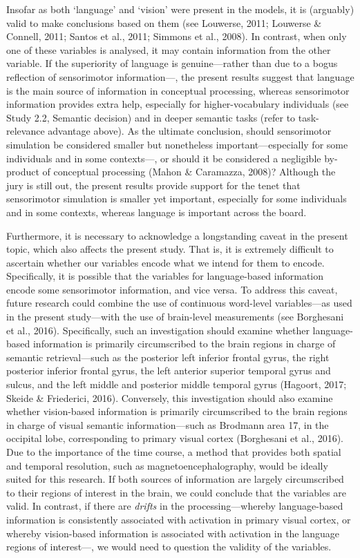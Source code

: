 \documentclass[
  12pt,
  man,floatsintext]{apa7}
\begin{document}
Insofar as both `language' and `vision' were present in the models, it is (arguably) valid to make conclusions based on them (see Louwerse, 2011; Louwerse \& Connell, 2011; Santos et al., 2011; Simmons et al., 2008). In contrast, when only one of these variables is analysed, it may contain information from the other variable. If the superiority of language is genuine---rather than due to a bogus reflection of sensorimotor information---, the present results suggest that language is the main source of information in conceptual processing, whereas sensorimotor information provides extra help, especially for higher-vocabulary individuals (see Study 2.2, Semantic decision) and in deeper semantic tasks (refer to task-relevance advantage above). As the ultimate conclusion, should sensorimotor simulation be considered smaller but nonetheless important---especially for some individuals and in some contexts---, or should it be considered a negligible by-product of conceptual processing (Mahon \& Caramazza, 2008)? Although the jury is still out, the present results provide support for the tenet that sensorimotor simulation is smaller yet important, especially for some individuals and in some contexts, whereas language is important across the board.

Furthermore, it is necessary to acknowledge a longstanding caveat in the present topic, which also affects the present study. That is, it is extremely difficult to ascertain whether our variables encode what we intend for them to encode. Specifically, it is possible that the variables for language-based information encode some sensorimotor information, and vice versa. To address this caveat, future research could combine the use of continuous word-level variables---as used in the present study---with the use of brain-level measurements (see Borghesani et al., 2016). Specifically, such an investigation should examine whether language-based information is primarily circumscribed to the brain regions in charge of semantic retrieval---such as the posterior left inferior frontal gyrus, the right posterior inferior frontal gyrus, the left anterior superior temporal gyrus and sulcus, and the left middle and posterior middle temporal gyrus (Hagoort, 2017; Skeide \& Friederici, 2016). Conversely, this investigation should also examine whether vision-based information is primarily circumscribed to the brain regions in charge of visual semantic information---such as Brodmann area 17, in the occipital lobe, corresponding to primary visual cortex (Borghesani et al., 2016). Due to the importance of the time course, a method that provides both spatial and temporal resolution, such as magnetoencephalography, would be ideally suited for this research. If both sources of information are largely circumscribed to their regions of interest in the brain, we could conclude that the variables are valid. In contrast, if there are \emph{drifts} in the processing---whereby language-based information is consistently associated with activation in primary visual cortex, or whereby vision-based information is associated with activation in the language regions of interest---, we would need to question the validity of the variables.
\end{document}

